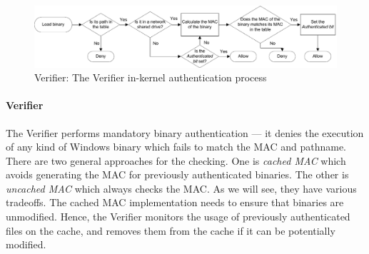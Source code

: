 
\begin{figure}[tb]
\begin{center}
\includegraphics[width=1.0\textwidth]{binauth/verifier}
\caption{Verifier: The Verifier in-kernel authentication process}
\label{fig:verifier}
\end{center}
\end{figure}


\paragraph{Verifier}

The Verifier performs mandatory binary authentication ---
it denies the execution of any kind of Windows binary which
fails to match the MAC and pathname.
There are two general approaches for the checking.
One is {\em cached MAC} which avoids generating the MAC for
previously authenticated binaries.
The other is {\em uncached MAC} which always checks the MAC.
As we will see, they have various tradeoffs.
The cached MAC implementation needs to ensure that binaries are unmodified.
Hence, the Verifier monitors the usage of previously authenticated files 
on the cache, and removes them from the cache if it can be potentially modified.


